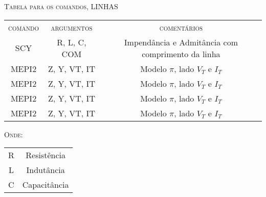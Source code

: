 \documentclass[a4paper,12pt]{article}
\begin{document}
\textsc{Tabela para os comandos, LINHAS}

\begin{center}
    \begin{tabular}{|c||c||c|}
        \textsc{comando} & \textsc{argumentos} & \textsc{comentários} \\
        \textsc{SCY} & R, L, C, COM & Impendância e Admitância com comprimento da linha\\
        \textsc{MEPI2} & Z, Y, VT, IT & Modelo $\pi$, lado $V_T$ e $I_T$ \\
        \textsc{MEPI2} & Z, Y, VT, IT & Modelo $\pi$, lado $V_T$ e $I_T$ \\
        \textsc{MEPI2} & Z, Y, VT, IT & Modelo $\pi$, lado $V_T$ e $I_T$ \\
        \textsc{MEPI2} & Z, Y, VT, IT & Modelo $\pi$, lado $V_T$ e $I_T$ \\

    \end{tabular}
\end{center}

\textsc{Onde:}

\begin{center}
    \begin{tabular}{|c||c|}
        R & Resistência \\
        L & Indutância \\
        C & Capacitância \\
    \end{tabular}
\end{center}
\end{document}
